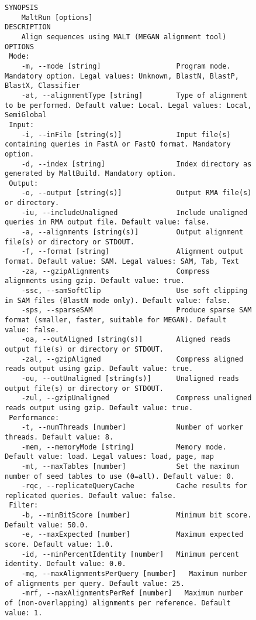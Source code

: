 \documentclass[11pt]{article}
\begin{document}
 \begin{figure}[h]
{\tiny
\begin{verbatim}
SYNOPSIS
	MaltRun [options]
DESCRIPTION
	Align sequences using MALT (MEGAN alignment tool)
OPTIONS
 Mode:
	-m, --mode [string]                  Program mode. Mandatory option. Legal values: Unknown, BlastN, BlastP, BlastX, Classifier
	-at, --alignmentType [string]        Type of alignment to be performed. Default value: Local. Legal values: Local, SemiGlobal
 Input:
	-i, --inFile [string(s)]             Input file(s) containing queries in FastA or FastQ format. Mandatory option.
	-d, --index [string]                 Index directory as generated by MaltBuild. Mandatory option.
 Output:
	-o, --output [string(s)]             Output RMA file(s) or directory. 
	-iu, --includeUnaligned              Include unaligned queries in RMA output file. Default value: false.
	-a, --alignments [string(s)]         Output alignment file(s) or directory or STDOUT. 
	-f, --format [string]                Alignment output format. Default value: SAM. Legal values: SAM, Tab, Text
	-za, --gzipAlignments                Compress alignments using gzip. Default value: true.
	-ssc, --samSoftClip                  Use soft clipping in SAM files (BlastN mode only). Default value: false.
	-sps, --sparseSAM                    Produce sparse SAM format (smaller, faster, suitable for MEGAN). Default value: false.
	-oa, --outAligned [string(s)]        Aligned reads output file(s) or directory or STDOUT. 
	-zal, --gzipAligned                  Compress aligned reads output using gzip. Default value: true.
	-ou, --outUnaligned [string(s)]      Unaligned reads output file(s) or directory or STDOUT. 
	-zul, --gzipUnaligned                Compress unaligned reads output using gzip. Default value: true.
 Performance:
	-t, --numThreads [number]            Number of worker threads. Default value: 8.
	-mem, --memoryMode [string]          Memory mode. Default value: load. Legal values: load, page, map
	-mt, --maxTables [number]            Set the maximum number of seed tables to use (0=all). Default value: 0.
	-rqc, --replicateQueryCache          Cache results for replicated queries. Default value: false.
 Filter:
	-b, --minBitScore [number]           Minimum bit score. Default value: 50.0.
	-e, --maxExpected [number]           Maximum expected score. Default value: 1.0.
	-id, --minPercentIdentity [number]   Minimum percent identity. Default value: 0.0.
	-mq, --maxAlignmentsPerQuery [number]   Maximum number of alignments per query. Default value: 25.
	-mrf, --maxAlignmentsPerRef [number]   Maximum number of (non-overlapping) alignments per reference. Default value: 1.

\end{verbatim}}
\end{figure}
\end{document}
